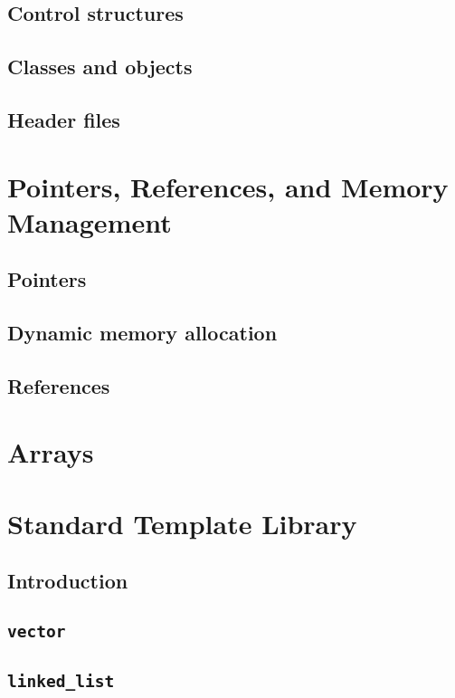 \documentclass[11pt,twoside]{book}
\begin{document}
\section{Control structures}

\section{Classes and objects}

\section{Header files}



\chapter{Pointers, References, and Memory Management}

\section{Pointers}

\section{Dynamic memory allocation}

\section{References}


\chapter{Arrays}


\chapter{Standard Template Library}

\section{Introduction}

\section{\tt vector}

\section{\tt linked\_list}
\end{document}
